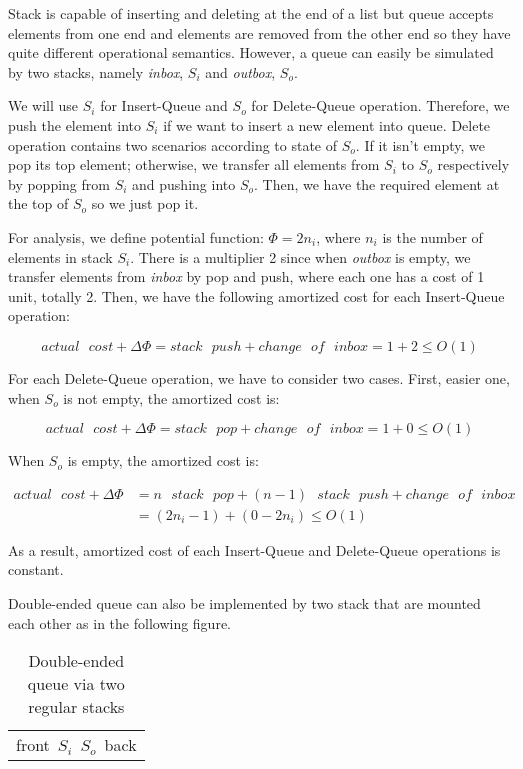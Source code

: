 Stack is capable of inserting and deleting at the end of a list but queue accepts elements from one end and elements are removed from the other end so they have quite different operational semantics. However, a queue can easily be simulated by two stacks, namely \textit{inbox}, $S_{i}$ and \textit{outbox}, $S_{o}$.

We will use $S_{i}$ for Insert-Queue and $S_{o}$ for Delete-Queue operation. Therefore, we push the element into $S_{i}$ if we want to insert a new element into queue. Delete operation contains two scenarios according to state of $S_{o}$. If it isn't empty, we pop its top element; otherwise, we transfer all elements from $S_{i}$ to $S_{o}$ respectively by popping from $S_{i}$ and pushing into $S_{o}$. Then, we have the required element at the top of $S_{o}$ so we just pop it.

For analysis, we define potential function: $\Phi = 2n_{i}$, where $n_{i}$ is the number of elements in stack $S_{i}$. There is a multiplier 2 since when \textit{outbox} is empty, we transfer elements from \textit{inbox} by pop and push, where each one has a cost of 1 unit, totally 2. Then, we have the following amortized cost for each Insert-Queue operation:

$$
actual\text{ }cost + \Delta\Phi = stack\text{ }push + change\text{ }of\text{ }inbox = 1 + 2 \leq O(1)
$$

For each Delete-Queue operation, we have to consider two cases. First, easier one, when $S_{o}$ is not empty, the amortized cost is:

$$
actual\text{ }cost + \Delta\Phi = stack\text{ }pop + change\text{ }of\text{ }inbox = 1 + 0 \leq O(1)
$$

When $S_{o}$ is empty, the amortized cost is:

\begin{align*}
	actual\text{ }cost + \Delta\Phi &=  n\text{ }stack\text{ }pop + (n-1)\text{ }stack\text{ }push + change\text{ }of\text{ }inbox \\
	&= (2n_{i} - 1) + (0 - 2n_{i}) \leq O(1)
\end{align*}

As a result, amortized cost of each Insert-Queue and Delete-Queue operations is constant.

Double-ended queue can also be implemented by two stack that are mounted each other as in the following figure.

\begin{table}[ht]
\begin{center}
\begin{tabular}{p{5cm}||p{5cm}}
  \hline  
  & \\
  \hline
  \multicolumn{2}{p{8cm}}{ \hbox{front \hspace{2cm} $S_{i}$  \hspace{4cm} $S_{o}$ \hspace{2cm} back}} \\
\end{tabular}
\caption{Double-ended queue via two regular stacks}
\end{center}
\end{table}

